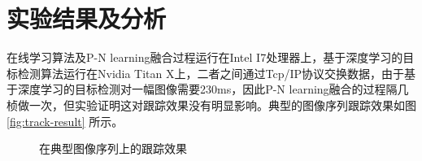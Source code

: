 \section{实验结果及分析}
在线学习算法及P-N learning融合过程运行在Intel I7处理器上，基于深度学习的目标检测算法运行在Nvidia Titan X上，二者之间通过Tcp/IP协议交换数据，由于基于深度学习的目标检测对一幅图像需要230ms，因此P-N learning融合的过程隔几桢做一次，但实验证明这对跟踪效果没有明显影响。典型的图像序列跟踪效果如图 \ref{fig:track-result} 所示。
\begin{figure}
	\caption{在典型图像序列上的跟踪效果}
\end{figure}